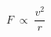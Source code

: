 \documentclass[border=8pt]{standalone}
\begin{document}
\begin{varwidth}{40em}
\LARGE\bfseries
\[ F \;\propto\; \dfrac{v^2}{r} \]
\end{varwidth}
\end{document}
